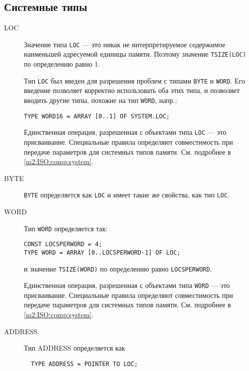 \subsection{Системные типы}\label{m2:system:types}

\begin{description}
\item[LOC] \mbox{}  

Значение типа {\tt LOC} --- это никак не интерпретируемое содержимое
наименьшей адресуемой единицы памяти. Поэтому значение
{\tt TSIZE(LOC)} по определению равно 1.

Тип {\tt LOC} был введен для разрешения проблем с типами
{\tt  BYTE}  и  {\tt  WORD}.
Его введение позволяет корректно использовать оба этих типа,
и позволяет вводить другие типы, похожие на тип {\tt WORD}, напр.:
\begin{verbatim}
TYPE WORD16 = ARRAY [0..1] OF SYSTEM.LOC;
\end{verbatim}

Единственная операция, разрешенная с объектами типа {\tt LOC} 
--- это присваивание.
Специальные правила определяют совместимость при передаче параметров
для системных типов памяти.
См. подробнее в \ref{m2:ISO:comp:system}.

\item[BYTE] \mbox{}  

{\tt BYTE} определяется как {\tt LOC} и имеет такие же свойства, как тип
{\tt LOC}.

\item[WORD] \mbox{} 

        Тип {\tt WORD} определяется так:
\begin{verbatim}
CONST LOCSPERWORD = 4;
TYPE WORD = ARRAY [0..LOCSPERWORD-1] OF LOC;
\end{verbatim}
и значение {\tt TSIZE(WORD)} по определению равно {\tt LOCSPERWORD}.

Единственная операция, разрешенная с объектами типа {\tt WORD} 
--- это присваивание.
Специальные правила определяют совместимость при передаче параметров
для системных типов памяти.
См. подробнее в \ref{m2:ISO:comp:system}.

\item[ADDRESS] \mbox{} 

        Тип ADDRESS определяется как
\begin{verbatim}
  TYPE ADDRESS = POINTER TO LOC;
\end{verbatim}


\end{description}
